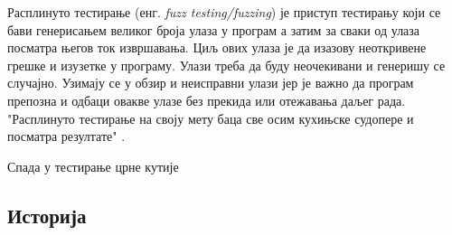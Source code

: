 \documentclass[12pt,oneside]{memoir}
\begin{document}
Расплинуто тестирање (енг. \textit{fuzz testing/fuzzing}) је приступ тестирању који се бави генерисањем великог броја улаза у програм а затим за сваки од улаза посматра његов  ток извршавања. Циљ ових улаза је да изазову неоткривене грешке и изузетке у програму. Улази треба да буду неочекивани и генеришу се случајно. Узимају се у обзир и неисправни улази јер је важно да програм препозна и одбаци овакве улазе без прекида или отежавања даљег рада. "Расплинуто тестирање на своју мету баца све осим кухињске судопере и посматра резултате" \cite{fuzzingBrute}. 

Спада у тестирање црне кутије

\subsection{Историја}
\label{subsec:history}
\end{document}
